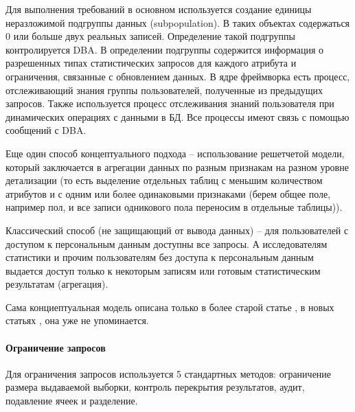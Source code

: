Для выполнения требований в основном используется создание единицы неразложимой подгруппы данных (subpopulation). В таких объектах содержаться 0 или больше двух реальных записей. Определение такой подгруппы контролируется DBA. В определении подгруппы содержится информация о разрешенных типах статистических запросов для каждого атрибута и ограничения, связанные с обновлением данных. В ядре фреймворка есть процесс, отслеживающий знания группы пользователей, полученные из предыдущих запросов. Также используется процесс отслеживания знаний пользователя при динамических операциях с данными в БД. Все процессы имеют связь с помощью сообщений с DBA.

Еще один способ концептуального подхода -- использование решетчетой модели, который заключается в агрегации данных по разным признакам на разном уровне детализации (то есть выделение отдельных таблиц с меньшим количеством атрибутов и с одним или более одинаковыми признаками (берем общее поле, например пол, и все записи одникового пола переносим в отдельные таблицы)).

Классический способ (не защищающий от вывода данных) -- для пользователей с доступом к персональным данным доступны все запросы. А исследователям статистики и прочим пользователям без доступа к персональным данным выдается доступ только к некоторым записям или готовым статистическим результатам (агрегация).

Сама конциептуальная модель описана только в более старой статье \cite{SDB1989}, в новых статьях \cite{SDB1999}, \cite{ComputerSecurity2008} она уже не упоминается.

\paragraph{Ограничение запросов}

Для ограничения запросов используется 5 стандартных методов: ограничение размера выдаваемой выборки, контроль перекрытия результатов, аудит, подавление ячеек и разделение.

